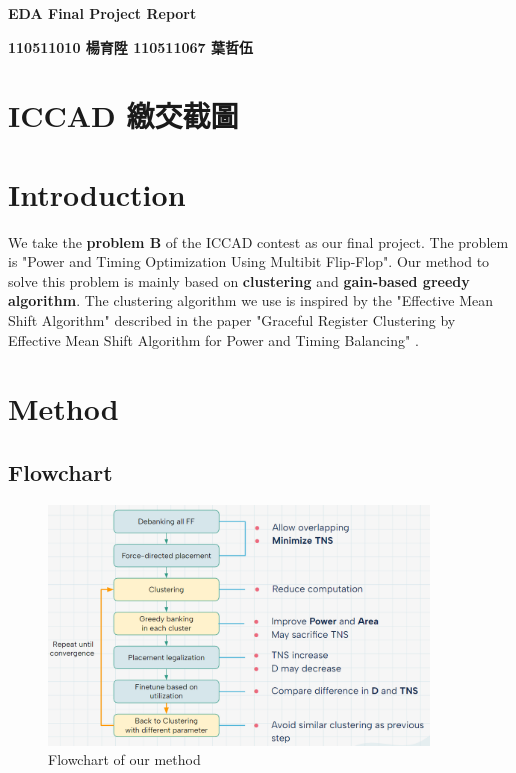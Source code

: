 \documentclass[12pt]{article}
\begin{document}
\begin{center}
    \huge \textbf{EDA Final Project Report}
    
    \vspace{10pt}
    
    \large \textbf{110511010 楊育陞 110511067 葉哲伍}
\end{center}

\section{ICCAD 繳交截圖}

\section{Introduction}

\indent We take the \textbf{problem B} of the ICCAD contest as our final project. The problem is "Power and Timing Optimization Using Multibit Flip-Flop". Our method to solve this problem is mainly based on \textbf{clustering} and \textbf{gain-based greedy algorithm}. The clustering algorithm we use is inspired by the "Effective Mean Shift Algorithm" described in the paper "Graceful Register Clustering by Effective Mean Shift Algorithm for Power and Timing Balancing" \cite{jiang}.

\section{Method}

\subsection{Flowchart}

\begin{figure}[htbp]
    \centering
    \includegraphics[width=0.9\textwidth]{flowchart2.png}
    \caption{Flowchart of our method}
    \label{fig:flowchart}
\end{figure}
\FloatBarrier
\end{document}
